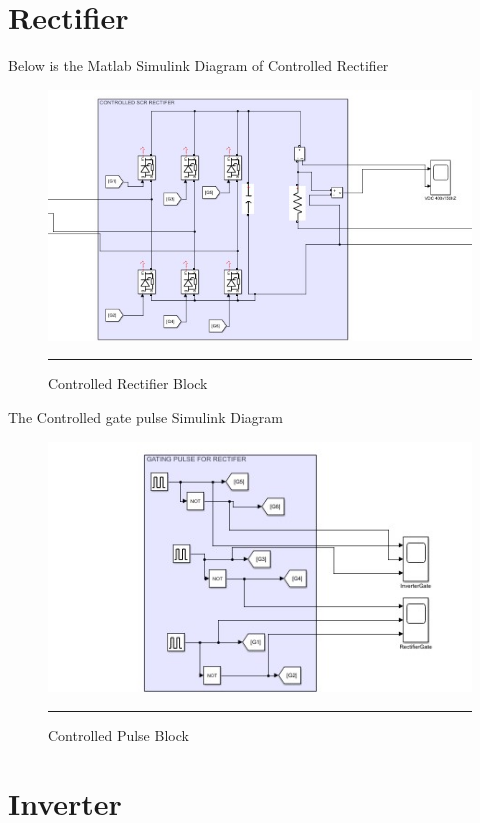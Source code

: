\section{Rectifier}
Below is the Matlab Simulink Diagram of Controlled Rectifier
\begin{figure}[htbp]
	\centering
	\includegraphics[width = 6in]{./Figures/rectifier1.jpg}
	\rule{35em}{1pt}
	\caption{Controlled Rectifier Block}
\end{figure}
The Controlled gate pulse Simulink Diagram
\begin{figure}[htbp]
	\centering
	\includegraphics[width = 6in]{./Figures/rectifier2.jpg}
	\rule{35em}{1pt}
	\caption{Controlled Pulse Block}
\end{figure}
\newpage
\section{Inverter}
